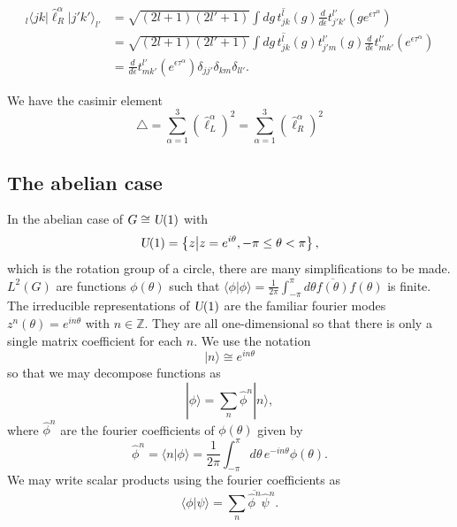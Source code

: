 \documentclass[12pt]{amsart}
\def\uone{\textsl{U}(1)}
\theoremstyle{definition}
\theoremstyle{remark}
\numberwithin{equation}{section}
\begin{document}
\begin{equation}
	\begin{split}
		{_l\langle jk|}\widehat{\ell}^\alpha_R|j'k'\rangle_{l'} &= \sqrt{(2l+1)(2l'+1)}\int dg\,   \overline{t^l_{jk}}(g)\frac{d}{d\epsilon} t_{j'k'}^{l'}(ge^{\epsilon \tau^\alpha})   \\
	 &= \sqrt{(2l+1)(2l'+1)}\int dg\,   \overline{t^l_{jk}}(g) t_{j'm}^{l'}(g)\frac{d}{d\epsilon}t_{m k'}^{l'}(e^{\epsilon \tau^\alpha}) \\
	 &= \frac{d}{d\epsilon} t_{mk'}^{l'}(e^{\epsilon \tau^\alpha}) \delta_{jj'}\delta_{km}\delta_{ll'}.
	\end{split}
\end{equation}

We have the casimir element 
\begin{equation}
	\triangle = \sum_{\alpha = 1}^3 (\widehat{\ell}_L^{\alpha})^2 =  \sum_{\alpha = 1}^3 (\widehat{\ell}_R^{\alpha})^2
\end{equation}

\subsection{The abelian case}

In the abelian case of $G \cong \uone$ with
\begin{equation}
   \uone = \left\{ z \middle| z = e^{i\theta}, -\pi \le \theta < \pi \right\},
\end{equation}
which is the rotation group of a circle, there are many simplifications to be made. 
$L^2(G)$ are functions $\phi(\theta)$
such that $\langle \phi | \phi \rangle = \frac{1}{2\pi}\int_{-\pi}^{\pi} d\theta \overline{f(\theta)} f(\theta)$ is
finite. The irreducible representations of $\uone$ are
the familiar fourier modes $z^n(\theta) = e^{in\theta}$ with $n \in \mathbb{Z}$.
They are all one-dimensional so that there is only a single matrix coefficient
for each $n$. We use the notation
\begin{equation}
  |n\rangle \cong e^{in\theta}
\end{equation}
so that we may decompose functions as
\begin{equation}
  |\phi\rangle = \sum_n \widehat{\phi}^n |n\rangle,
\end{equation}
where $\hat{\phi}^n$ are the fourier coefficients of $\phi(\theta)$
given by
\begin{equation}
  \widehat{\phi}^n = \langle n|\phi\rangle = \frac{1}{2\pi} \int_{-\pi}^{\pi} d\theta \, e^{-in\theta} \phi(\theta).
\end{equation}
We may write scalar products using the fourier coefficients as
\begin{equation}
  \langle \phi|\psi\rangle = \sum_n \overline{\widehat{\phi}^n} \widehat{\psi}^n.
\end{equation}
\end{document}
